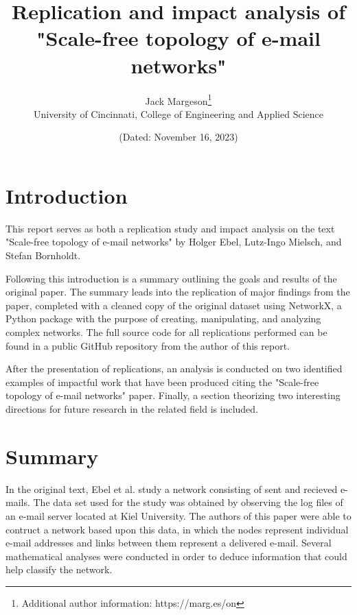 \documentclass[a4paper]{article}
\title{Replication and impact analysis of\\"Scale-free topology of e-mail networks" }
\author{Jack Margeson\thanks{Additional author information: https://marg.es/on}\\
University of Cincinnati, College of Engineering and Applied Science}
\date{\normalsize{(Dated: November 16, 2023)}}
\begin{document}
\maketitle

\vspace{-3mm} %

\begin{abstract}
    \blindtext
\end{abstract}

\vspace{5mm} %

\begin{multicols}{2}

\section{Introduction}
\hspace*{\parindent}This report serves as both a replication study and impact analysis on the text "Scale-free topology of e-mail networks" \cite{1} by Holger Ebel, Lutz-Ingo Mielsch, and Stefan Bornholdt. 

Following this introduction is a summary outlining the goals and results of the original paper. The summary leads into the replication of major findings from the paper, completed with a cleaned copy of the original dataset using NetworkX, a Python package with the purpose of creating, manipulating, and analyzing complex networks. The full source code for all replications performed can be found in a public GitHub repository \cite{2} from the author of this report. 

After the presentation of replications, an analysis is conducted on two identified examples of impactful work that have been produced citing the "Scale-free topology of e-mail networks" paper. Finally, a section theorizing two interesting directions for future research in the related field is included.

\section{Summary}
\hspace*{\parindent}In the original text, Ebel et al. study a network consisting of sent and recieved e-mails. The data set used for the study was obtained by observing the log files of an e-mail server located at Kiel University. The authors of this paper were able to contruct a network based upon this data, in which the nodes represent individual e-mail addresses and links between them represent a delivered e-mail. Several mathematical analyses were conducted in order to deduce information that could help classify the network. 


\end{multicols}
\end{document}
